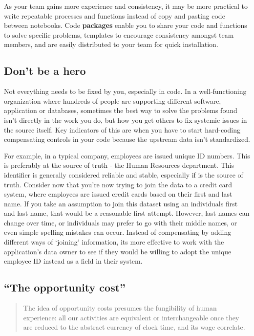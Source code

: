\documentclass[
]{book}
\begin{document}
As your team gains more experience and consistency, it may be more practical to write repeatable processes and functions instead of copy and pasting code between notebooks. Code \textbf{packages} enable you to share your code and functions to solve specific problems, templates to encourage consistency amongst team members, and are easily distributed to your team for quick installation.

\hypertarget{dont-be-a-hero}{%
\subsection{Don't be a hero}\label{dont-be-a-hero}}

Not everything needs to be fixed by you, especially in code. In a well-functioning organization where hundreds of people are supporting different software, application or databases, sometimes the best way to solve the problems found isn't directly in the work you do, but how you get others to fix systemic issues in the source itself. Key indicators of this are when you have to start hard-coding compensating controls in your code because the upstream data isn't standardized.

For example, in a typical company, employees are issued unique ID numbers. This is preferably at the source of truth - the Human Resources department. This identifier is generally considered reliable and stable, especially if is the source of truth. Consider now that you're now trying to join the data to a credit card system, where employees are issued credit cards based on their first and last name. If you take an assumption to join this dataset using an individuals first and last name, that would be a reasonable first attempt. However, last names can change over time, or individuals may prefer to go with their middle names, or even simple spelling mistakes can occur. Instead of compensating by adding different ways of `joining' information, its more effective to work with the application's data owner to see if they would be willing to adopt the unique employee ID instead as a field in their system.

\hypertarget{the-opportunity-cost}{%
\subsection{``The opportunity cost''}\label{the-opportunity-cost}}

\begin{quote}
The idea of opportunity costs presumes the fungibility of human experience: all our activities are equivalent or interchangeable once they are reduced to the abstract currency of clock time, and its wage correlate. \citep{shop-class}
\end{quote}
\end{document}
